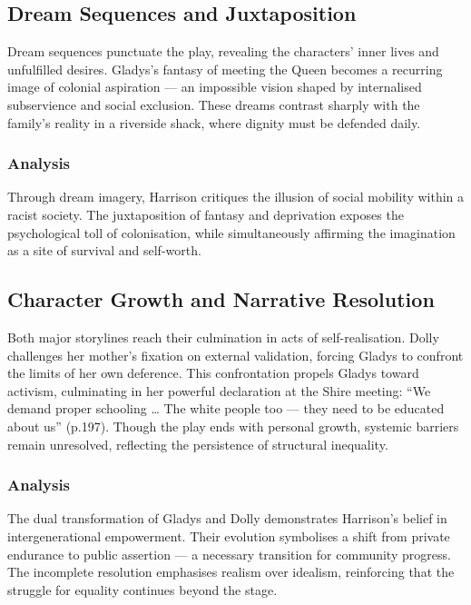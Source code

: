 \documentclass[a4paper]{article}
\begin{document}
\subsection{Dream Sequences and Juxtaposition}
Dream sequences punctuate the play, revealing the characters’ inner lives and unfulfilled desires. Gladys’s fantasy of meeting the Queen becomes a recurring image of colonial aspiration — an impossible vision shaped by internalised subservience and social exclusion. These dreams contrast sharply with the family’s reality in a riverside shack, where dignity must be defended daily.\\

\subsubsection{Analysis}
Through dream imagery, Harrison critiques the illusion of social mobility within a racist society. The juxtaposition of fantasy and deprivation exposes the psychological toll of colonisation, while simultaneously affirming the imagination as a site of survival and self-worth.\\

\subsection{Character Growth and Narrative Resolution}
Both major storylines reach their culmination in acts of self-realisation. Dolly challenges her mother’s fixation on external validation, forcing Gladys to confront the limits of her own deference. This confrontation propels Gladys toward activism, culminating in her powerful declaration at the Shire meeting: “We demand proper schooling … The white people too — they need to be educated about us” (p.197). Though the play ends with personal growth, systemic barriers remain unresolved, reflecting the persistence of structural inequality.\\

\subsubsection{Analysis}
The dual transformation of Gladys and Dolly demonstrates Harrison’s belief in intergenerational empowerment. Their evolution symbolises a shift from private endurance to public assertion — a necessary transition for community progress. The incomplete resolution emphasises realism over idealism, reinforcing that the struggle for equality continues beyond the stage.\\
\end{document}
